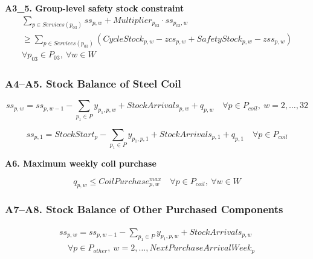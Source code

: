 \documentclass{article}
\begin{document}
\noindent\textbf{A3\_5. Group-level safety stock constraint}
\begin{equation}
\begin{gathered}
\sum_{p \in Services(p_{03})} ss_{p,w}
+ Multiplier_{p_{03}} \cdot ss_{p_{03},w} \\
\geq \sum_{p \in Services(p_{03})}
\left(
CycleStock_{p,w} - zcs_{p,w}
+ SafetyStock_{p,w} - zss_{p,w}
\right) \\
\forall p_{03} \in P_{03},\ \forall w \in W
\end{gathered}
\label{eq:A3_4}
\end{equation}




\subsubsection*{A4--A5. Stock Balance of Steel Coil}

\begin{equation}
ss_{p,w} = ss_{p,w-1} - \sum_{p_1 \in P} y_{p_1,p,w} 
+ StockArrivals_{p,w} + q_{p,w}
\quad \forall p \in P_{coil},\ w = 2,\ldots,32
\label{eq:A4}
\end{equation}

\begin{equation}
ss_{p,1} = StockStart_p - \sum_{p_1 \in P} y_{p_1,p,1} 
+ StockArrivals_{p,1} + q_{p,1}
\quad \forall p \in P_{coil}
\label{eq:A5}
\end{equation}

\noindent\textbf{A6. Maximum weekly coil purchase}

\begin{equation}
q_{p,w} \leq CoilPurchase^{max}_{p,w}
\quad \forall p \in P_{coil},\ \forall w \in W
\label{eq:A6}
\end{equation}


\subsubsection*{A7--A8. Stock Balance of Other Purchased 
Components}


\begin{equation}
\begin{gathered}
ss_{p,w} = ss_{p,w-1} - \sum_{p_1 \in P} y_{p_1,p,w} 
+ StockArrivals_{p,w} \\
\quad \forall p \in P_{other},\ w = 2,\ldots,NextPurchaseArrivalWeek_p
\end{gathered}
\label{eq:A7}
\end{equation}
\end{document}

